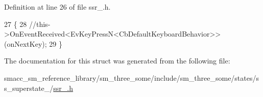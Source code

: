 Definition at line 26 of file ssr\+\_.\+h.


\begin{DoxyCode}
27   \{
28     \textcolor{comment}{//this->OnEventReceived<EvKeyPressN<CbDefaultKeyboardBehavior>>(onNextKey);}
29   \}
\end{DoxyCode}


The documentation for this struct was generated from the following file\+:\begin{DoxyCompactItemize}
\item 
smacc\+\_\+sm\+\_\+reference\+\_\+library/sm\+\_\+three\+\_\+some/include/sm\+\_\+three\+\_\+some/states/ss\+\_\+superstate\+\_/\hyperlink{ssr__3_8h}{ssr\+\_.\+h}\end{DoxyCompactItemize}

